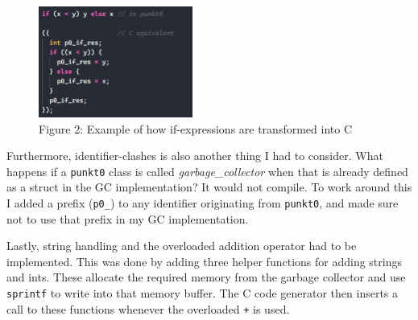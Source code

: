 \begin{figure}
    \centering
    \includegraphics[width=0.45\textwidth]{imgs/if-exprs.png}
    {\\ \scriptsize Figure 2: Example of how if-expressions are transformed into C}
\end{figure}

Furthermore, identifier-clashes is also another thing I had to consider. What happens if a \texttt{punkt0} class is called \textit{garbage\_collector} when that is already defined as a struct in the GC implementation? It would not compile. To work around this I added a prefix (\texttt{p0\_}) to any identifier originating from \texttt{punkt0}, and made sure not to use that prefix in my GC implementation.

Lastly, string handling and the overloaded addition operator had to be implemented. This was done by adding three helper functions for adding strings and ints. These allocate the required memory from the garbage collector and use \texttt{sprintf} to write into that memory buffer. The C code generator then inserts a call to these functions whenever the overloaded \texttt{+} is used.
